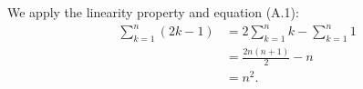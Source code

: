 We apply the linearity property and equation (A.1):
\begin{align*}
    \sum_{k=1}^n(2k-1) &= 2\sum_{k=1}^nk-\sum_{k=1}^n1 \\
    &= \frac{2n(n+1)}{2}-n \\
    &= n^2.
\end{align*}
